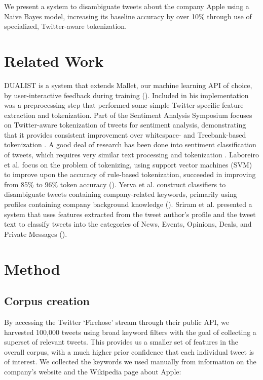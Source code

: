\documentclass[letterpaper]{article}
\begin{document}
We present a system to disambiguate tweets about the company Apple using a Naive Bayes model, increasing its baseline accuracy by over 10\% through use of specialized, Twitter-aware tokenization.

\section{Related Work}
DUALIST is a system that extends Mallet, our machine learning API of choice, by user-interactive feedback during training (\citeauthor{Settles:2011:CLF:2145432.2145588}). Included in his implementation was a preprocessing step that performed some simple Twitter-specific feature extraction and tokenization. Part of the Sentiment Analysis Symposium focuses on Twitter-aware tokenization of tweets for sentiment analysis, demonstrating that it provides consistent improvement over whitespace- and Treebank-based tokenization \cite{potts2011}. A good deal of research has been done into sentiment classification of tweets, which requires very similar text processing and tokenization \cite{Pak10}. Laboreiro et al. focus on the problem of tokenizing, using support vector machines (SVM) to improve upon the accuracy of rule-based tokenization, succeeded in improving from 85\% to 96\% token accuracy (\citeauthor{Laboreiro:2010:TMM:1871840.1871853}). Yerva et al. construct classifiers to disambiguate tweets containing company-related keywords, primarily using profiles containing company background knowledge (\citeauthor{journals/ijcsa/YervaMA12}). Sriram et al. presented a system that uses features extracted from the tweet author's profile and the tweet text to classify tweets into the categories of News, Events, Opinions, Deals, and Private Messages (\citeauthor{Sriram:2010:STC:1835449.1835643}).

\section{Method}
\subsection{Corpus creation}
By accessing the Twitter `Firehose' stream through their public API, we harvested 100,000 tweets using broad keyword filters with the goal of collecting a superset of relevant tweets. This provides us a smaller set of features in the overall corpus, with a much higher prior confidence that each individual tweet is of interest. We collected the keywords we used manually from information on the company's website and the Wikipedia page about Apple:\\
\end{document}
